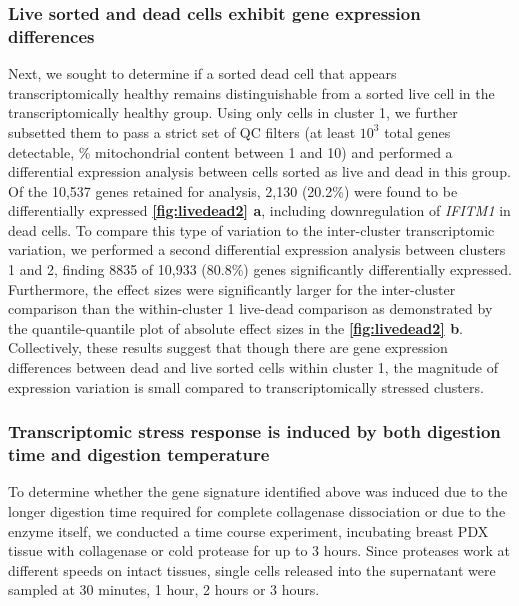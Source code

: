 \subsubsection{Live sorted and dead cells exhibit gene expression differences}
Next, we sought to determine if a sorted dead cell that appears transcriptomically healthy remains distinguishable from a sorted live cell in the transcriptomically healthy group. Using only cells in cluster 1, we further subsetted them to pass a strict set of QC filters (at least $10^3$ total genes detectable, \% mitochondrial content between 1 and 10) and performed a differential expression analysis between cells sorted as live and dead in this group. Of the 10,537 genes retained for analysis, 2,130 (20.2\%) were found to be differentially expressed \textbf{\autoref{fig:livedead2} a}, including downregulation of \textit{IFITM1} in dead cells. To compare this type of variation to the inter-cluster transcriptomic variation, we performed a second differential expression analysis between clusters 1 and 2, finding 8835 of 10,933 (80.8\%) genes significantly differentially expressed. Furthermore, the effect sizes were significantly larger for the inter-cluster comparison than the within-cluster 1 live-dead comparison as demonstrated by the quantile-quantile plot of absolute effect sizes in the \textbf{\autoref{fig:livedead2} b}. Collectively, these results suggest that though there are gene expression differences between dead and live sorted cells within cluster 1, the magnitude of expression variation is small compared to transcriptomically stressed clusters.
 
\subsubsection{Transcriptomic stress response is induced by both digestion time and digestion temperature}
To determine whether the gene signature identified above was induced due to the longer digestion time required for complete collagenase dissociation or due to the enzyme itself, we conducted a time course experiment, incubating breast PDX tissue with collagenase or cold protease for up to 3 hours. Since proteases work at different speeds on intact tissues, single cells released into the supernatant were sampled at 30 minutes, 1 hour, 2 hours or 3 hours.   


